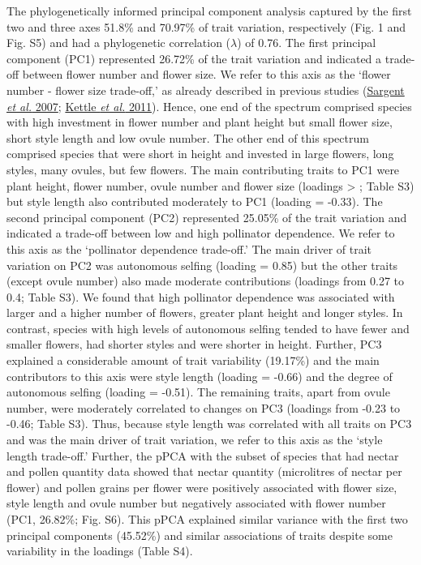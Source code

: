 \documentclass[
  12pt,
  a4paper,
]{article}
\begin{document}
The phylogenetically informed principal component analysis captured by the first two and three axes 51.8\% and 70.97\% of trait variation, respectively (Fig. 1 and Fig. S5) and had a phylogenetic correlation (\(\lambda\)) of 0.76. The first principal component (PC1) represented 26.72\% of the trait variation and indicated a trade-off between flower number and flower size. We refer to this axis as the `flower number - flower size trade-off,' as already described in previous studies (\protect\hyperlink{ref-sargent2007}{Sargent \emph{et al.} 2007}; \protect\hyperlink{ref-kettle2011}{Kettle \emph{et al.} 2011}). Hence, one end of the spectrum comprised species with high investment in flower number and plant height but small flower size, short style length and low ovule number. The other end of this spectrum comprised species that were short in height and invested in large flowers, long styles, many ovules, but few flowers. The main contributing traits to PC1 were plant height, flower number, ovule number and flower size (loadings \textgreater{} \textbar; Table S3) but style length also contributed moderately to PC1 (loading = -0.33). The second principal component (PC2) represented 25.05\% of the trait variation and indicated a trade-off between low and high pollinator dependence. We refer to this axis as the `pollinator dependence trade-off.' The main driver of trait variation on PC2 was autonomous selfing (loading = 0.85) but the other traits (except ovule number) also made moderate contributions (loadings from 0.27 to 0.4; Table S3). We found that high pollinator dependence was associated with larger and a higher number of flowers, greater plant height and longer styles. In contrast, species with high levels of autonomous selfing tended to have fewer and smaller flowers, had shorter styles and were shorter in height. Further, PC3 explained a considerable amount of trait variability (19.17\%) and the main contributors to this axis were style length (loading = -0.66) and the degree of autonomous selfing (loading = -0.51). The remaining traits, apart from ovule number, were moderately correlated to changes on PC3 (loadings from -0.23 to -0.46; Table S3). Thus, because style length was correlated with all traits on PC3 and was the main driver of trait variation, we refer to this axis as the `style length trade-off.' Further, the pPCA with the subset of species that had nectar and pollen quantity data showed that nectar quantity (microlitres of nectar per flower) and pollen grains per flower were positively associated with flower size, style length and ovule number but negatively associated with flower number (PC1, 26.82\%; Fig. S6). This pPCA explained similar variance with the first two principal components (45.52\%) and similar associations of traits despite some variability in the loadings (Table S4).
\end{document}
